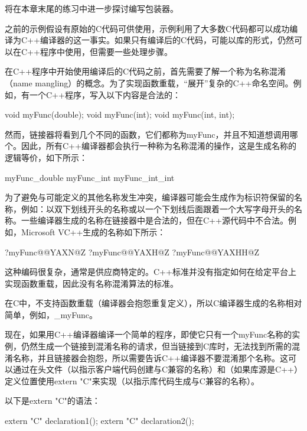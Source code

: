 将在本章末尾的练习中进一步探讨编写包装器。


之前的示例假设有原始的C代码可供使用，示例利用了大多数C代码都可以成功编译为C++编译器的这一事实。如果只有编译后的C代码，可能以库的形式，仍然可以在C++程序中使用，但需要一些处理步骤。

在C++程序中开始使用编译后的C代码之前，首先需要了解一个称为名称混淆（name mangling）的概念。为了实现函数重载，“展开”复杂的C++命名空间。例如，有一个C++程序，写入以下内容是合法的：

\begin{cpp}
void myFunc(double);
void myFunc(int);
void myFunc(int, int);
\end{cpp}

然而，链接器将看到几个不同的函数，它们都称为myFunc，并且不知道想调用哪个。因此，所有C++编译器都会执行一种称为名称混淆的操作，这是生成名称的逻辑等价，如下所示：

\begin{shell}
myFunc_double
myFunc_int
myFunc_int_int
\end{shell}

为了避免与可能定义的其他名称发生冲突，编译器可能会生成作为标识符保留的名称，例如：以双下划线开头的名称或以一个下划线后面跟着一个大写字母开头的名称。一些编译器生成的名称在链接器中是合法的，但在C++源代码中不合法。例如，Microsoft VC++生成的名称如下所示：

\begin{shell}
?myFunc@@YAXN@Z
?myFunc@@YAXH@Z
?myFunc@@YAXHH@Z
\end{shell}

这种编码很复杂，通常是供应商特定的。C++标准并没有指定如何在给定平台上实现函数重载，因此没有名称混淆算法的标准。

在C中，不支持函数重载（编译器会抱怨重复定义），所以C编译器生成的名称相对简单，例如，\_myFunc。

现在，如果用C++编译器编译一个简单的程序，即使它只有一个myFunc名称的实例，仍然生成一个链接到混淆名称的请求，但当链接到C库时，无法找到所需的混淆名称，并且链接器会抱怨，所以需要告诉C++编译器不要混淆那个名称。这可以通过在头文件（以指示客户端代码创建与C兼容的名称）和（如果库源是C++）定义位置使用extern "C"来实现（以指示库代码生成与C兼容的名称）。

以下是extern "C"的语法：

\begin{cpp}
extern "C" declaration1();
extern "C" declaration2();
\end{cpp}

